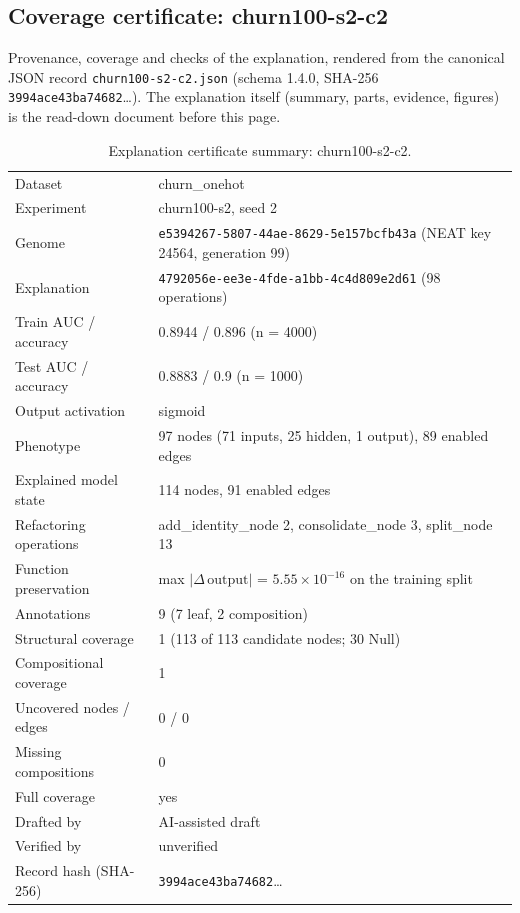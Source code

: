 \providecommand{\explaneatcertdir}[1]{}
\begin{drafted}
\section{Coverage certificate: churn100-s2-c2}\label{app:churn100-s2-c2:sec}
Provenance, coverage and checks of the explanation, rendered from the canonical JSON record \texttt{churn100-s2-c2.json} (schema 1.4.0, SHA-256 \texttt{3994ace43ba74682}\ldots). The explanation itself (summary, parts, evidence, figures) is the read-down document before this page.

\begin{table}[htbp]
\centering\small
\begin{tabularx}{\linewidth}{@{}lX@{}}
\toprule
Dataset & churn\_\allowbreak{}onehot \\
Experiment & churn100-s2, seed 2 \\
Genome & \texttt{e5394267-5807-44ae-8629-5e157bcfb43a} (NEAT key 24564, generation 99) \\
Explanation & \texttt{4792056e-ee3e-4fde-a1bb-4c4d809e2d61} (98 operations) \\
Train AUC / accuracy & 0.8944 / 0.896 (n = 4000) \\
Test AUC / accuracy & 0.8883 / 0.9 (n = 1000) \\
Output activation & sigmoid \\
Phenotype & 97 nodes (71 inputs, 25 hidden, 1 output), 89 enabled edges \\
Explained model state & 114 nodes, 91 enabled edges \\
Refactoring operations & add\_\allowbreak{}identity\_\allowbreak{}node 2, consolidate\_\allowbreak{}node 3, split\_\allowbreak{}node 13 \\
Function preservation & max $|\Delta\,\mathrm{output}|$ = $5.55\times 10^{-16}$ on the training split \\
Annotations & 9 (7 leaf, 2 composition) \\
Structural coverage & 1 (113 of 113 candidate nodes; 30 Null) \\
Compositional coverage & 1 \\
Uncovered nodes / edges & 0 / 0 \\
Missing compositions & 0 \\
Full coverage & yes \\
Drafted by & AI-assisted draft \\
Verified by & unverified \\
Record hash (SHA-256) & \texttt{3994ace43ba74682}\ldots \\
\bottomrule
\end{tabularx}
\caption{Explanation certificate summary: churn100-s2-c2.}
\label{app:churn100-s2-c2:summary}
\end{table}

\end{drafted}
